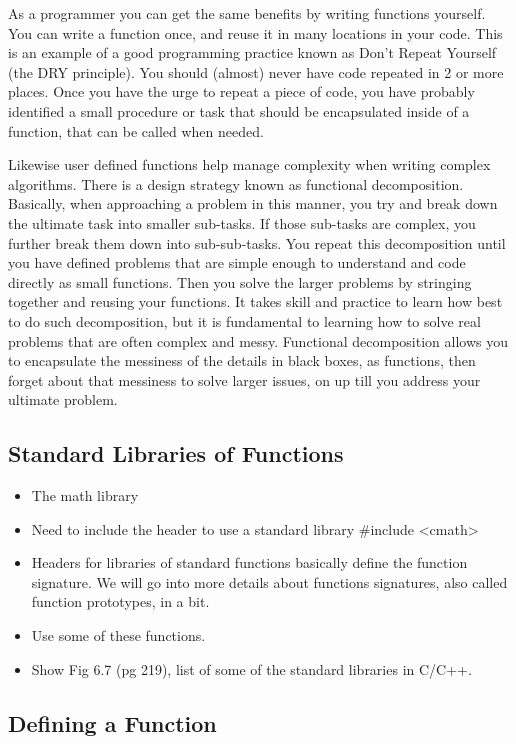 \documentclass[11pt]{article}
\begin{document}
As a programmer you can get the same benefits by writing functions
yourself.  You can write a function once, and reuse it in many
locations in your code.  This is an example of a good programming
practice known as Don't Repeat Yourself (the DRY principle).  You
should (almost) never have code repeated in 2 or more places.  Once
you have the urge to repeat a piece of code, you have probably
identified a small procedure or task that should be encapsulated
inside of a function, that can be called when needed.

Likewise user defined functions help manage complexity when writing
complex algorithms.  There is a design strategy known as functional
decomposition.  Basically, when approaching a problem in this manner,
you try and break down the ultimate task into smaller sub-tasks.  If
those sub-tasks are complex, you further break them down into
sub-sub-tasks.  You repeat this decomposition until you have defined
problems that are simple enough to understand and code directly as
small functions.  Then you solve the larger problems by stringing
together and reusing your functions.  It takes skill and practice to
learn how best to do such decomposition, but it is fundamental to
learning how to solve real problems that are often complex and messy.
Functional decomposition allows you to encapsulate the messiness of
the details in black boxes, as functions, then forget about that
messiness to solve larger issues, on up till you address your ultimate
problem.
 
\subsection{Standard Libraries of Functions}
\label{sec-1-2}


\begin{itemize}
\item The math library
\item Need to include the header to use a standard library \#include <cmath>
\item Headers for libraries of standard functions basically define the
  function signature.  We will go into more details about functions
  signatures, also called function prototypes, in a bit.
\item Use some of these functions.
\item Show Fig 6.7 (pg 219), list of some of the standard libraries in C/C++.
\end{itemize}
\subsection{Defining a Function}
\label{sec-1-3}
\end{document}
